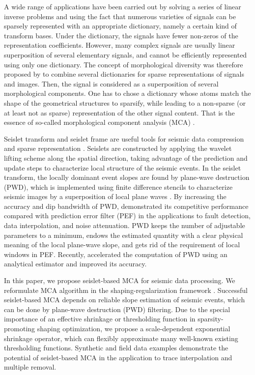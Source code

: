 A wide range of applications have been carried out by solving a series of linear inverse problems and using the fact that numerous varieties of signals can be sparsely represented with an appropriate dictionary, namely a certain kind of transform bases. Under the dictionary, the signals have fewer non-zeros of the representation coefficients. However, many complex signals are usually linear superposition of several elementary signals, and cannot be efficiently represented using only one dictionary. The concept of morphological diversity was therefore proposed by \cite{starck2004redundant,starck2005image} to combine several dictionaries for sparse representations of signals and images. Then, the signal is considered as a superposition of several morphological components. One has to chose a dictionary whose atoms match the shape of the geometrical structures to sparsify, while leading to a non-sparse (or at least not as sparse) representation of the other signal content. That is the essence of so-called morphological component analysis (MCA) \citep{starck2004redundant,starck2007undecimated,woiselle20113}.

Seislet transform and seislet frame are useful tools for seismic data compression and sparse representation \citep{fomel2010seislet}. Seislets are constructed by applying the wavelet lifting scheme \citep{sweldens1998lifting} along the spatial direction, taking advantage of the prediction and update steps to characterize local structure of the seismic events.
In the seislet transform, the locally dominant event slopes are found by plane-wave destruction (PWD), which is implemented using finite difference stencils to characterize seismic images by a superposition of local plane waves \citep{claerbout1992earth}. By increasing the accuracy and dip bandwidth of PWD, \cite{fomel2002applications} demonstrated its competitive performance compared with prediction error filter (PEF) in the applications to fault detection, data interpolation, and noise attenuation. PWD keeps the number of adjustable parameters to a minimum, endows the estimated quantity with a clear physical meaning of the local plane-wave slope, and gets rid of the requirement of local windows in PEF. Recently, \cite{chen2013accelerated,chen2013omnidirectional} accelerated the computation of PWD using an analytical estimator and improved its accuracy.


In this paper, we propose seislet-based MCA for seismic data processing. We reformulate MCA algorithm in the shaping-regularization framework \citep{fomel2007shaping,fomel2008nonlinear}. Successful seislet-based MCA depends on reliable slope estimation of seismic events, which can be done by plane-wave destruction (PWD) filtering. Due to the special importance of an effective shrinkage or thresholding function in sparsity-promoting shaping optimization, we propose a scale-dependent exponential shrinkage operator, which can flexibly  approximate many well-known existing thresholding functions. Synthetic and field data examples demonstrate the potential of seislet-based MCA in the application to trace interpolation and multiple removal.


